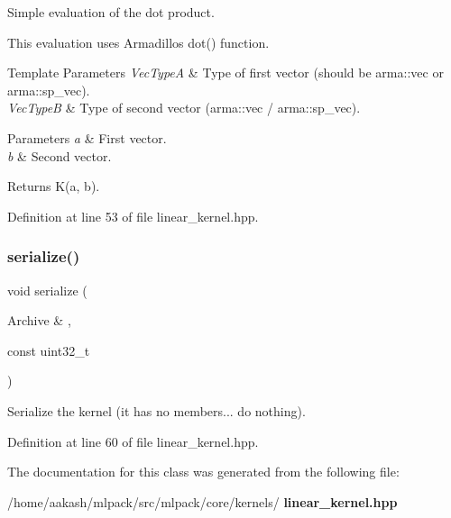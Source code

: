 Simple evaluation of the dot product. 

This evaluation uses Armadillo\textquotesingle{}s dot() function.


\begin{DoxyTemplParams}{Template Parameters}
{\em Vec\+TypeA} & Type of first vector (should be arma\+::vec or arma\+::sp\+\_\+vec). \\
\hline
{\em Vec\+TypeB} & Type of second vector (arma\+::vec / arma\+::sp\+\_\+vec). \\
\hline
\end{DoxyTemplParams}

\begin{DoxyParams}{Parameters}
{\em a} & First vector. \\
\hline
{\em b} & Second vector. \\
\hline
\end{DoxyParams}
\begin{DoxyReturn}{Returns}
K(a, b). 
\end{DoxyReturn}


Definition at line 53 of file linear\+\_\+kernel.\+hpp.

\mbox{\label{classmlpack_1_1kernel_1_1LinearKernel_aa2ccb5a0533a6ba0abe6dfc1f98fbafb}} 
\subsubsection{serialize()}
{\footnotesize\ttfamily void serialize (\begin{DoxyParamCaption}\item[{Archive \&}]{,  }\item[{const uint32\+\_\+t}]{ }\end{DoxyParamCaption})\hspace{0.3cm}{\ttfamily [inline]}}



Serialize the kernel (it has no members... do nothing). 



Definition at line 60 of file linear\+\_\+kernel.\+hpp.



The documentation for this class was generated from the following file\+:\begin{DoxyCompactItemize}
\item 
/home/aakash/mlpack/src/mlpack/core/kernels/\textbf{ linear\+\_\+kernel.\+hpp}\end{DoxyCompactItemize}
